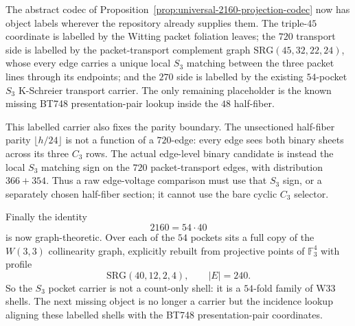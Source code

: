 
\makeatletter
{}
\makeatother
\providecommand{\PSp}{\mathrm{PSp}}
\providecommand{\Aut}{\mathrm{Aut}}
\providecommand{\spec}{\operatorname{spec}}


\begin{corollary}
\label{cor:labelled-2160-pocket-shells}
The abstract codec of Proposition~\ref{prop:universal-2160-projection-codec} now
has object labels wherever the repository already supplies them.  The
triple-$45$ coordinate is labelled by the Witting packet foliation leaves; the
$720$ transport side is labelled by the packet-transport complement graph
$\mathrm{SRG}(45,32,22,24)$, whose every edge carries a unique local $S_3$
matching between the three packet lines through its endpoints; and the $270$ side
is labelled by the existing $54$-pocket $S_3$ K-Schreier transport carrier.  The
only remaining placeholder is the known missing BT748 presentation-pair lookup
inside the $48$ half-fiber.

This labelled carrier also fixes the parity boundary.  The unsectioned half-fiber
parity $\lfloor h/24\rfloor$ is not a function of a $720$-edge: every edge sees
both binary sheets across its three $C_3$ rows.  The actual edge-level binary
candidate is instead the local $S_3$ matching sign on the $720$ packet-transport
edges, with distribution $366+354$.  Thus a raw edge-voltage comparison must use
that $S_3$ sign, or a separately chosen half-fiber section; it cannot use the
bare cyclic $C_3$ selector.

Finally the identity
\[
2160=54\cdot40
\]
is now graph-theoretic.  Over each of the $54$ pockets sits a full copy of the
$W(3,3)$ collinearity graph, explicitly rebuilt from projective points of
$\mathbb F_3^4$ with profile
\[
\mathrm{SRG}(40,12,2,4),\qquad |E|=240.
\]
So the $S_3$ pocket carrier is not a count-only shell: it is a $54$-fold family of
W33 shells.  The next missing object is no longer a carrier but the incidence
lookup aligning these labelled shells with the BT748 presentation-pair
coordinates.
\end{corollary}
